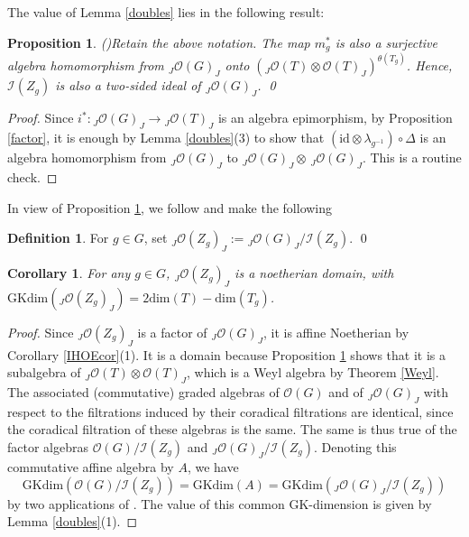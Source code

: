 \documentclass{amsart}
\numberwithin{equation}{section}
\newtheorem{proposition}[theorem]{Proposition}
\newtheorem{corollary}[theorem]{Corollary}
\theoremstyle{definition}
\newtheorem{definition}[theorem]{Definition}
\begin{document}
The value of Lemma \ref{doubles} lies in the following result:

\begin{proposition}{\rm (\cite[Proposition 4.1]{G2})}\label{homo}
Retain the above notation. The map $m_g^{\ast}$ is also a surjective algebra homomorphism from $_J\mathcal{O}(G)_J$ onto 
$({}_J\mathcal{O}(T) \otimes \mathcal{O}(T)_J)^{\theta(T_g)}$. 
Hence, $\mathcal{I}(Z_g)$ is also a two-sided ideal of ${}_J\mathcal{O}(G)_J$. \qed
\end{proposition}

\begin{proof} 
Since $i^{\ast} :{}_J\mathcal{O}(G)_J \rightarrow {}_J\mathcal{O}(T)_J$ is an algebra epimorphism, by Proposition \ref{factor}, it is  enough by Lemma \ref{doubles}(3) to show that $(\mathrm{id} \otimes \lambda_{g^{-1}})\circ \Delta$ is an algebra homomorphism from ${}_J\mathcal{O}(G)_J$ to ${}_J\mathcal{O}(G)_J \otimes \,{}_J\mathcal{O}(G)_J$. This is a routine check.
\end{proof}

In view of Proposition \ref{homo}, we follow \cite{G2} and make the following 
\begin{definition}\label{strat1} For $g \in G$, set ${}_J\mathcal{O}(Z_g)_J := {}_J\mathcal{O}(G)_J/\mathcal{I}(Z_g)$. \qed
\end{definition}

\begin{corollary}\cite[Corollary 4.2]{G2}\label{strat2} 
For any $g \in G$, ${}_J\mathcal{O}(Z_g)_J$ is a noetherian domain, with
$ \mathrm{GKdim}({}_J\mathcal{O}(Z_g)_J)=2\mathrm{dim}(T) - \mathrm{dim}(T_g)$.
\end{corollary}

\begin{proof} 
Since ${}_J\mathcal{O}(Z_g)_J$ is a factor of ${}_J\mathcal{O}(G)_J$, it is affine Noetherian by Corollary \ref{IHOEcor}(1). It is a domain because Proposition \ref{homo} shows that it is a subalgebra of ${}_J\mathcal{O}(T) \otimes \mathcal{O}(T)_J$, which is a Weyl algebra by Theorem \ref{Weyl}. The associated (commutative) graded algebras of $\mathcal{O}(G)$ and of ${}_J\mathcal{O}(G)_J$ with respect to the filtrations induced by their coradical filtrations are identical, since the coradical filtration of these algebras is the same. The same is thus true of the factor algebras $\mathcal{O}(G)/\mathcal{I}(Z_g)$ and ${}_J\mathcal{O}(G)_J/\mathcal{I}(Z_g)$. Denoting this commutative affine algebra by $A$, we have
$$ \mathrm{GKdim}(\mathcal{O}(G)/\mathcal{I}(Z_g))=\mathrm{GKdim}(A)=\mathrm{GKdim}({}_J\mathcal{O}(G)_J/\mathcal{I}(Z_g)) $$
by two applications of \cite[Proposition 6.6]{KL}. The value of this common GK-dimension is given by Lemma \ref{doubles}(1).
\end{proof}
\end{document}
